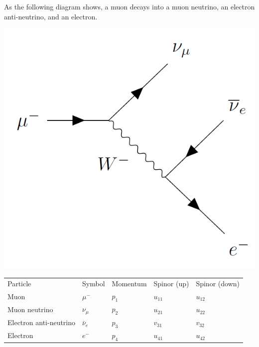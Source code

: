 \documentclass[12pt]{article}
\begin{document}
As the following diagram shows, a muon decays into a muon neutrino, an electron anti-neutrino,
and an electron.
\begin{center}
\includegraphics[scale=0.25]{muon-decay-diagram.png}
\end{center}

\begin{center}
\begin{tabular}{lllll}
Particle & Symbol & Momentum & Spinor (up) & Spinor (down)
\\[2ex]
Muon & $\mu^-$ & $p_1$ & $u_{11}$ & $u_{12}$
\\
Muon neutrino & $\nu_\mu$ & $p_2$ & $u_{21}$ & $u_{22}$
\\
Electron anti-neutrino & $\bar{\nu}_e$ & $p_3$ & $v_{31}$ & $v_{32}$
\\
Electron & $e^-$ & $p_4$ & $u_{41}$ & $u_{42}$
\end{tabular}
\end{center}
\end{document}
